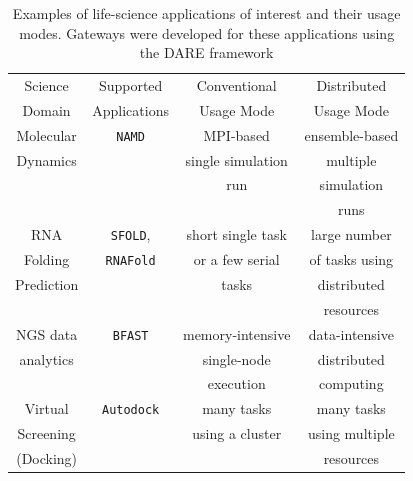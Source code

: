 \documentclass[]{svjour3}
\begin{document}


\begin{table}
\centering
 \small
\begin{tabular}{|c|c|c|c|} 
  \hline Science  & Supported  & Conventional   &   Distributed
  \\
  Domain & Applications & Usage Mode & Usage Mode\\ \hline \hline 
  
  Molecular   &  \texttt{NAMD} &  MPI-based  & ensemble-based   \\
  Dynamics  &  & single simulation  & multiple  \\ 
  &  & run &  simulation  \\ 
  &  &  &  runs \\ \hline
  RNA   & \texttt{SFOLD}, & short single task    & large number  \\
  Folding   & \texttt{RNAFold} & or a few serial & of tasks using   \\
  Prediction & &  tasks &distributed \\
  &  &  &   resources  \\ \hline
  NGS data     &  \texttt{BFAST} & memory-intensive  & data-intensive\\ 
  analytics  &  &  single-node   &  distributed  \\
  & & execution  & computing \\ \hline
  Virtual  & \texttt{Autodock} &  many tasks   & many tasks \\
  Screening  &  & using a cluster  & using multiple  \\
  (Docking) &  &  & resources \\ \hline
  \hline
\end{tabular} \caption{Examples of life-science applications of
  interest and their usage modes.  Gateways were developed for these
  applications using the DARE framework }
 \label{table:four-applications} 
\end{table}

\end{document}
